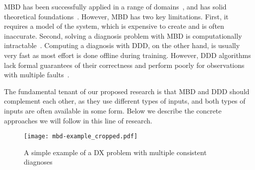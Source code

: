 \documentclass[12pt]{article}
\begin{document}
MBD has been successfully applied in a range of domains~\cite{williams96,struss2003model,wotawa2002model}, and has solid theoretical foundations~\cite{deKleer1987diagnosing,reiter1987theory}. However, MBD has two key limitations. First, it requires a model of the system, which is expensive to create and is often inaccurate. Second, solving a diagnosis problem with MBD is computationally intractable~\cite{bylander1991computational}. Computing a diagnosis with DDD, on the other hand, is usually very fast as most effort is done offline during training. However, DDD algorithms lack formal guarantees of their correctness and perform poorly for observations with multiple faults~\cite{keren2011model}. 


The fundamental tenant of our proposed research is that MBD and DDD should complement each other, as they use different types of inputs, and both types of inputs are often available in some form. 
Below we describe the concrete approaches we will follow in this line of research.



\begin{figure}
    \centering
	\texttt{[image: mbd-example\_cropped.pdf]}
    \caption{A simple example of a DX problem with multiple consistent diagnoses}
    \label{fig:mbd-example}
\end{figure}

\end{document}
